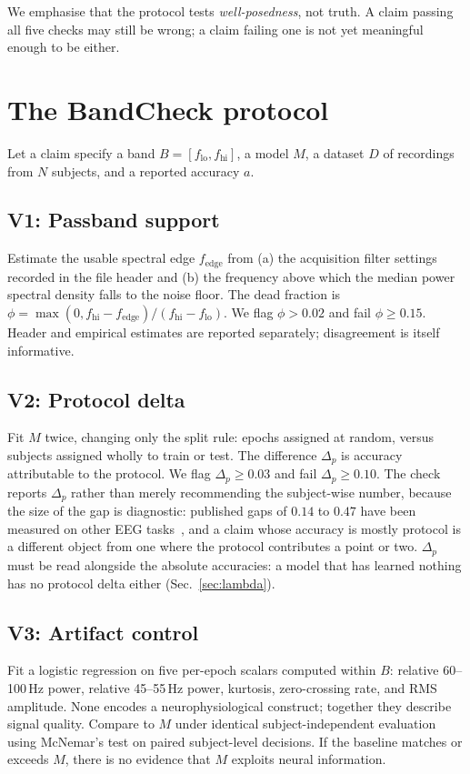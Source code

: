 \documentclass[10pt,conference]{IEEEtran}
\begin{document}
We emphasise that the protocol tests \emph{well-posedness}, not truth. A claim
passing all five checks may still be wrong; a claim failing one is not yet
meaningful enough to be either.

\section{The BandCheck protocol}

Let a claim specify a band $B=[f_\mathrm{lo},f_\mathrm{hi}]$, a model $M$, a
dataset $D$ of recordings from $N$ subjects, and a reported accuracy $a$.

\subsection{V1: Passband support}
Estimate the usable spectral edge $f_\mathrm{edge}$ from (a) the acquisition
filter settings recorded in the file header and (b) the frequency above which
the median power spectral density falls to the noise floor. The dead fraction is
$\phi = \max(0, f_\mathrm{hi}-f_\mathrm{edge})/(f_\mathrm{hi}-f_\mathrm{lo})$.
We flag $\phi>0.02$ and fail $\phi\geq0.15$. Header and empirical estimates are
reported separately; disagreement is itself informative.

\subsection{V2: Protocol delta}
Fit $M$ twice, changing only the split rule: epochs assigned at random, versus
subjects assigned wholly to train or test. The difference $\Delta_p$ is accuracy
attributable to the protocol. We flag $\Delta_p\geq0.03$ and fail
$\Delta_p\geq0.10$. The check reports $\Delta_p$ rather than merely recommending
the subject-wise number, because the size of the gap is diagnostic: published
gaps of $0.14$ to $0.47$ have been measured on other EEG
tasks~\cite{brookshire2024}, and a claim whose accuracy is mostly protocol is a
different object from one where the protocol contributes a point or two.
$\Delta_p$ must be read alongside the absolute accuracies: a model that has
learned nothing has no protocol delta either (Sec.~\ref{sec:lambda}).

\subsection{V3: Artifact control}
Fit a logistic regression on five per-epoch scalars computed within $B$:
relative 60--100\,Hz power, relative 45--55\,Hz power, kurtosis, zero-crossing
rate, and RMS amplitude. None encodes a neurophysiological construct; together
they describe signal quality. Compare to $M$ under identical subject-independent
evaluation using McNemar's test on paired subject-level decisions. If the
baseline matches or exceeds $M$, there is no evidence that $M$ exploits neural
information.
\end{document}

